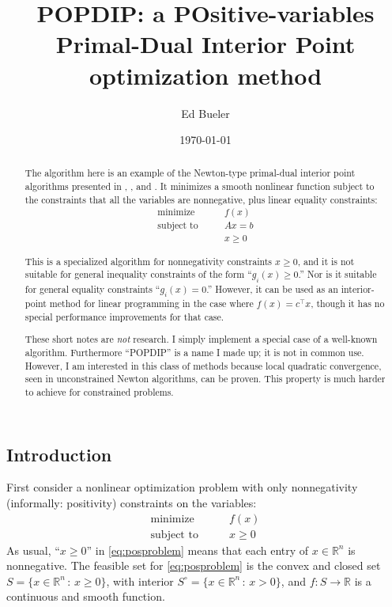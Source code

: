 \documentclass[11pt]{article}
\title{POPDIP: a POsitive-variables \\ Primal-Dual Interior Point optimization method}
\author{Ed Bueler}
\date{\today}
\newcommand{\RR}{\mathbb{R}}
\begin{document}
\maketitle

\begin{abstract}
The algorithm here is an example of the Newton-type primal-dual interior point algorithms presented in \cite[algorithm 16.1, section 16.7]{GrivaNashSofer2009}, \cite[chapter 19]{NocedalWright2006}, and \cite{YamashitaYabe1996}.  It minimizes a smooth nonlinear function subject to the constraints that all the variables are nonnegative, plus linear equality constraints:
\begin{equation}
\begin{matrix}
\text{minimize} \qquad   & f(x) \\
\text{subject to} \qquad & A x = b \\
                         & x \ge 0
\end{matrix} \label{eq:problem}
\end{equation}

This is a specialized algorithm for nonnegativity constraints $x\ge 0$, and it is not suitable for general inequality constraints of the form ``$g_i(x)\ge 0$.''  Nor is it suitable for general equality constraints ``$g_i(x)=0$.''  However, it can be used as an interior-point method for linear programming in the case where $f(x)=c^\top x$, though it has no special performance improvements for that case.

These short notes are \emph{not} research.  I simply implement a special case of a well-known algorithm.  Furthermore ``POPDIP'' is a name I made up; it is not in common use.  However, I am interested in this class of methods because local quadratic convergence, seen in unconstrained Newton algorithms, can be proven.  This property is much harder to achieve for constrained problems.
\end{abstract}

\thispagestyle{empty}

\bigskip
\subsection*{Introduction}

First consider a nonlinear optimization problem with only nonnegativity (informally: positivity) constraints on the variables:
\begin{equation}
\begin{matrix}
\text{minimize} \qquad & f(x) \\
\text{subject to} \qquad & x \ge 0
\end{matrix} \label{eq:posproblem}
\end{equation}
As usual, ``$x\ge 0$'' in \eqref{eq:posproblem} means that each entry of $x\in\RR^n$ is nonnegative.  The feasible set for \eqref{eq:posproblem} is the convex and closed set $S = \{x\in \RR^n\,:\,x\ge 0\}$, with interior $S^\circ = \{x\in \RR^n\,:\,x > 0\}$, and $f:S \to \RR$ is a continuous and smooth function.
\end{document}

